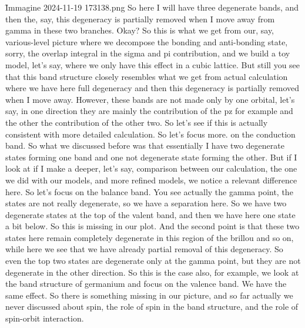 \f{Immagine 2024-11-19 173138.png}
So here I will have three degenerate bands, and then the, say, this degeneracy is partially removed when I move away from gamma in these two branches. Okay? So this is what we get from our, say, various-level picture where we decompose the bonding and anti-bonding state, sorry, the overlap integral in the sigma and pi contribution, and we build a toy model, let's say, where we only have this effect in a cubic lattice. But still you see that this band structure closely resembles what we get from actual calculation where we have here full degeneracy and then this degeneracy is partially removed when I move away. However, these bands are not made only by one orbital, let's say, in one direction they are mainly the contribution of the pz for example and the other the contribution of the other two. So let's see if this is actually consistent with more detailed calculation. So let's focus more. on the conduction band. So what we discussed before was that essentially I have two degenerate states forming one band and one not degenerate state forming the other. But if I look at if I make a deeper, let's say, comparison between our calculation, the one we did with our models, and more refined models, we notice a relevant difference here.
So let's focus on the balance band. You see actually the gamma point, the states are not really degenerate, so we have a separation here. So we have two degenerate states at the top of the valent band, and then we have here one state a bit below. So this is missing in our plot. And the second point is that these two states here remain completely degenerate in this region of the brillou and so on, while here we see that we have already partial removal of this degeneracy. So even the top two states are degenerate only at the gamma point, but they are not degenerate in the other direction. So this is the case also, for example, we look at the band structure of germanium and focus on the valence band. We have the same effect. So there is something missing in our picture, and so far actually we never discussed about spin, the role of spin in the band structure, and the role of spin-orbit interaction.
